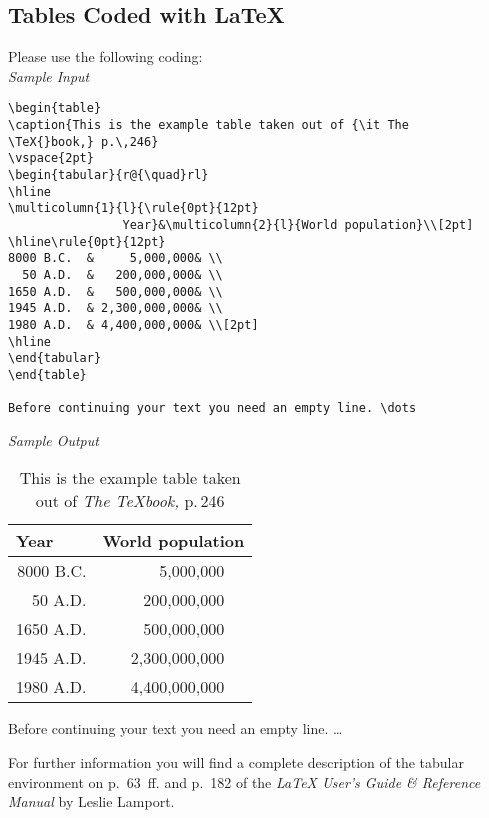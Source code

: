 \subsection{Tables Coded with \protect\LaTeX{}}
%
Please use the following coding:\\[2mm]
{\it Sample Input}
\begin{verbatim}
\begin{table}
\caption{This is the example table taken out of {\it The
\TeX{}book,} p.\,246}
\vspace{2pt}
\begin{tabular}{r@{\quad}rl}
\hline
\multicolumn{1}{l}{\rule{0pt}{12pt}
                Year}&\multicolumn{2}{l}{World population}\\[2pt]
\hline\rule{0pt}{12pt}
8000 B.C.  &     5,000,000& \\
  50 A.D.  &   200,000,000& \\
1650 A.D.  &   500,000,000& \\
1945 A.D.  & 2,300,000,000& \\
1980 A.D.  & 4,400,000,000& \\[2pt]
\hline
\end{tabular}
\end{table}

Before continuing your text you need an empty line. \dots
\end{verbatim}
{\it Sample Output}
\begin{table}
\caption{This is the example table taken out of {\it The
\TeX{}book,} p.\,246}
\vspace{2pt}
\begin{tabular}{r@{\quad}rl}
\hline
\multicolumn{1}{l}{\rule{0pt}{12pt}
                Year}&\multicolumn{2}{l}{World population}\\[2pt]
\hline\rule{0pt}{12pt}
8000 B.C.  &     5,000,000& \\
  50 A.D.  &   200,000,000& \\
1650 A.D.  &   500,000,000& \\
1945 A.D.  & 2,300,000,000& \\
1980 A.D.  & 4,400,000,000& \\[2pt]
\hline
\end{tabular}
\end{table}

Before continuing your text you need an empty line. \dots

\vspace{3mm}
For further information you will find a complete description of
the tabular environment
on p.~63~ff. and p.~182 of the {\em \LaTeX{} User's Guide \& Reference
Manual\/} by Leslie Lamport.
%
